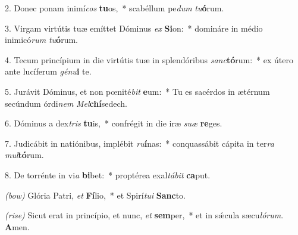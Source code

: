 2. Donec ponam inimí\textit{cos} \textbf{tu}os,~* scabéllum pe\textit{dum} \textit{tu}\textbf{ó}rum.

3. Virgam virtútis tuæ emíttet Dóminus \textit{ex} \textbf{Si}on:~* domináre in médio inimicó\textit{rum} \textit{tu}\textbf{ó}rum.

4. Tecum princípium in die virtútis tuæ in splendóribus \textit{sanc}\textbf{tó}rum:~* ex útero ante lucíferum \textit{gé}\textit{nu}\textbf{i} te.

5. Jurávit Dóminus, et non p{\oe}nité\textit{bit} \textbf{e}um:~*
Tu es sacérdos in ætérnum secúndum órdi\textit{nem} \textit{Mel}\textbf{chí}se\-dech.

6. Dóminus a dex\textit{tris} \textbf{tu}is,~* confrégit in die iræ \textit{su}\textit{æ} \textbf{re}ges.

7. Judicábit in natiónibus, implébit \textit{ru}\textbf{í}nas:~* conquassábit cápita in ter\textit{ra} \textit{mul}\textbf{tó}rum.

8. De torrénte in vi\textit{a} \textbf{bi}bet:~* proptérea exal\textit{tá}\textit{bit} \textbf{ca}put.

\textit{(bow)} Glória Patri, \textit{et} \textbf{Fí}lio,~* et Spirí\textit{tu}\textit{i} \textbf{Sanc}to.

\textit{(rise)} Sicut erat in princípio, et nunc, \textit{et} \textbf{sem}per,~* et in s\'{\ae}cula sæcu\textit{ló}\textit{rum}. \textbf{A}men.